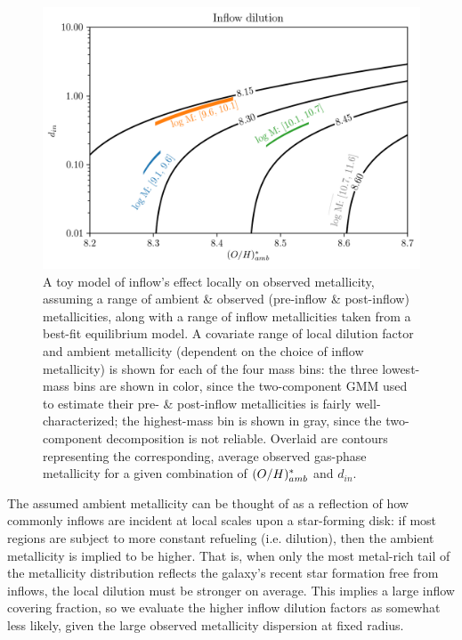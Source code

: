 \begin{figure}
    \centering
    \includegraphics[width=\textwidth]{oh-ambient_d-in_color-oh-obs}
    \caption[A toy model of inflow's diluting effects on local metallicity and the mass increase of the associated gas reservoir.]{A toy model of inflow's effect locally on observed metallicity, assuming a range of ambient \& observed (pre-inflow \& post-inflow) metallicities, along with a range of inflow metallicities taken from a best-fit equilibrium model. A covariate range of local dilution factor and ambient metallicity (dependent on the choice of inflow metallicity) is shown for each of the four mass bins: the three lowest-mass bins are shown in color, since the two-component GMM used to estimate their pre- \& post-inflow metallicities is fairly well-characterized; the highest-mass bin is shown in gray, since the two-component decomposition is not reliable. Overlaid are contours representing the corresponding, average observed gas-phase metallicity for a given combination of $(O/H)^*_{amb}$ and $d_{in}$.}
    \label{fig:oh-ambient_d-in_color-oh-obs}
\end{figure}

The assumed ambient metallicity can be thought of as a reflection of how commonly inflows are incident at local scales upon a star-forming disk: if most regions are subject to more constant refueling (i.e. dilution), then the ambient metallicity is implied to be higher. That is, when only the most metal-rich tail of the metallicity distribution reflects the galaxy's recent star formation free from inflows, the local dilution must be stronger on average. This implies a large inflow covering fraction, so we evaluate the higher inflow dilution factors as somewhat less likely, given the large observed metallicity dispersion at fixed radius.

